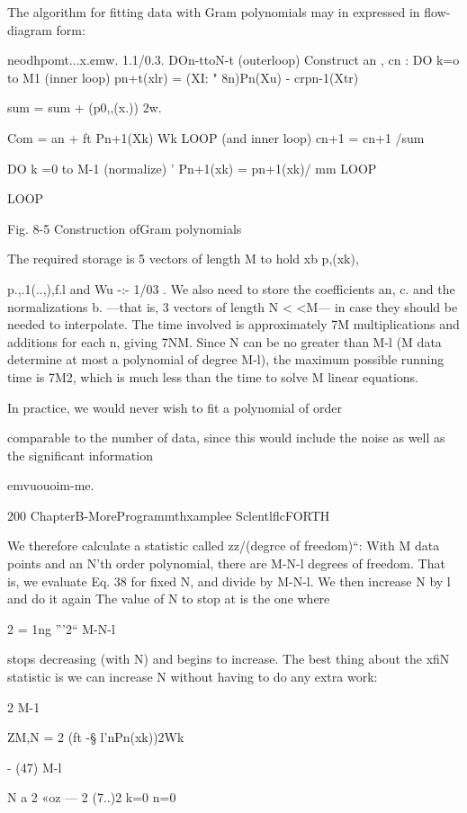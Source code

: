 {{{The algorithm for ﬁtting data with Gram polynomials may in
expressed in ﬂow-diagram form:

neodhpomt...x.¢mw. 1.1/0.3.
DOn-ttoN-t (outerloop)
Construct an , cn :
DO k=o to M1 (inner loop)
pn+t(xlr) = (XI: " 8n)Pn(Xu) - crpn-1(Xtr)

sum = sum + (p0,,(x.)) 2w.

Com = an + ft Pn+1(Xk) Wk
LOOP (and inner loop)
cn+1 = cn+1 /sum

DO k =0 to M-1 (normalize)
’ Pn+1(xk) = pn+1(xk)/ mm
LOOP

LOOP

 

 

Fig. 8-5 Construction ofGram polynomials

The required storage is 5 vectors of length M to hold xb p,(xk),

p.,.1(.\:.,),f.l and Wu -:- 1/03 . We also need to store the coefficients
an, c. and the normalizations b. —that is, 3 vectors of length
N < <M— in case they should be needed to interpolate. The time
involved is approximately 7M multiplications and additions for
each n, giving 7NM. Since N can be no greater than M-l (M data
determine at most a polynomial of degree M-l), the maximum
possible running time is 7M2, which is much less than the time to
solve M linear equations.

In practice, we would never wish to ﬁt a polynomial of order

comparable to the number of data, since this would include the
noise as well as the signiﬁcant information

emvuouoim-me.

200 ChapterB-MoreProgrammthxamplee SclentlﬂcFORTH

We therefore calculate a statistic called zz/(degrce of freedom)“:
With M data points and an N’th order polynomial, there are
M-N-l degrees of freedom. That is, we evaluate Eq. 38 for ﬁxed
N, and divide by M-N-l. We then increase N by l and do it again
The value of N to stop at is the one where

2
= 1ng
”'2“ M-N-l

stops decreasing (with N) and begins to increase.
The best thing about the xﬁN statistic is we can increase N without
having to do any extra work:

2 M-1

ZM,N = 2 (ft -§ l’nPn(xk))2Wk

- (47)
M-l

N
a 2 «oz — 2 (7..)2
k=0 n=0

}}}

